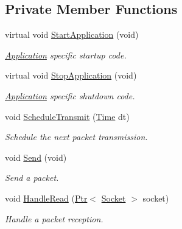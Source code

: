 \subsection*{Private Member Functions}
\begin{DoxyCompactItemize}
\item 
virtual void \hyperlink{classns3_1_1UdpEchoClient_a48fffea76bbceda5b0bec9c3007411fc}{Start\+Application} (void)
\begin{DoxyCompactList}\small\item\em \hyperlink{classns3_1_1Application}{Application} specific startup code. \end{DoxyCompactList}\item 
virtual void \hyperlink{classns3_1_1UdpEchoClient_ae7aba9059fa05430d62583804f1504c6}{Stop\+Application} (void)
\begin{DoxyCompactList}\small\item\em \hyperlink{classns3_1_1Application}{Application} specific shutdown code. \end{DoxyCompactList}\item 
void \hyperlink{classns3_1_1UdpEchoClient_aa80d42ed9fca35af021a8063686744b4}{Schedule\+Transmit} (\hyperlink{classns3_1_1Time}{Time} dt)
\begin{DoxyCompactList}\small\item\em Schedule the next packet transmission. \end{DoxyCompactList}\item 
void \hyperlink{classns3_1_1UdpEchoClient_acdbfd43efe67c30d2eb0b92a8dcbcdde}{Send} (void)
\begin{DoxyCompactList}\small\item\em Send a packet. \end{DoxyCompactList}\item 
void \hyperlink{classns3_1_1UdpEchoClient_a44ea5f4d53219277cde466b9141d0d12}{Handle\+Read} (\hyperlink{classns3_1_1Ptr}{Ptr}$<$ \hyperlink{classns3_1_1Socket}{Socket} $>$ socket)
\begin{DoxyCompactList}\small\item\em Handle a packet reception. \end{DoxyCompactList}\end{DoxyCompactItemize}
